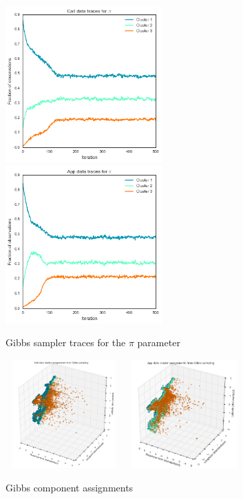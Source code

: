 \documentclass[twoside]{article}
\theoremstyle{theorem}
\theoremstyle{theorem}
\theoremstyle{theorem}
\theoremstyle{lemma}
\theoremstyle{definition}
\theoremstyle{example}
\begin{document}
\begin{figure}[h!]
\begin{center}
\includegraphics[width=60mm]{calldatapitrace}
\includegraphics[width=60mm]{appdatapitrace}
\caption{Gibbs sampler traces for the $\pi$ parameter}
\label{trace}
\end{center}
\end{figure}


\begin{figure}[h!]
\begin{center}
\includegraphics[width=45mm, height=42mm]{gibbscallclusterassignments}
\includegraphics[width=45mm, height=42mm]{gibbsappclusterassignments}
\caption{Gibbs component assignments}
\label{gibbsclusters}
\end{center}
\end{figure}
\end{document}
